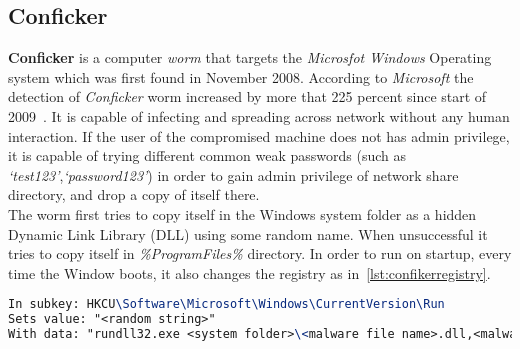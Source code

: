 \subsection{Conficker}
\label{sub:Conficker}
\textbf{Conficker} is a computer \emph{worm} that targets the \emph{Microsfot Windows} Operating system which was first found in November 2008.
According to \emph{Microsoft} the detection of \emph{Conficker} worm increased by more that 225 percent since start of 2009~\cite[]{conficker}.
It is capable of infecting and spreading across network without any human interaction.
If the user of the compromised machine does not has admin privilege, it is capable of trying different common weak passwords (such as \emph{`test123'},\emph{`password123'}) in order to gain admin privilege of network share directory, and drop a copy of itself there.\\
The worm first tries to copy itself in the Windows system folder as a hidden Dynamic Link Library (DLL) using some random name. When unsuccessful it tries to copy itself in \emph{\%ProgramFiles\%} directory.
In order to run on startup, every time the Window boots, it also changes the registry as in~\autoref{lst:confikerregistry}.
\begin{lstlisting}[language=TeX,caption={Registry key created by Confiker worm for autostart},label={lst:confikerregistry}]
In subkey: HKCU\Software\Microsoft\Windows\CurrentVersion\Run
Sets value: "<random string>"
With data: "rundll32.exe <system folder>\<malware file name>.dll,<malware parameters>"
\end{lstlisting}
